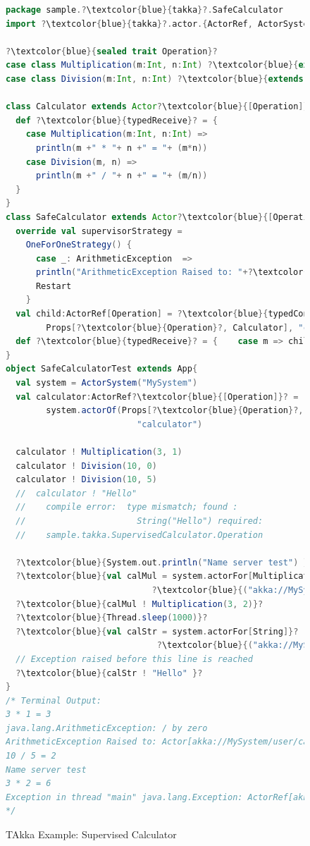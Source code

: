 \begin{figure}[p]
    \begin{lstlisting}[language=scala, escapechar=?]
package sample.?\textcolor{blue}{takka}?.SafeCalculator
import ?\textcolor{blue}{takka}?.actor.{ActorRef, ActorSystem, Props, Actor}

?\textcolor{blue}{sealed trait Operation}?
case class Multiplication(m:Int, n:Int) ?\textcolor{blue}{extends Operation}?
case class Division(m:Int, n:Int) ?\textcolor{blue}{extends Operation}?

class Calculator extends Actor?\textcolor{blue}{[Operation]}?{
  def ?\textcolor{blue}{typedReceive}? = {
    case Multiplication(m:Int, n:Int) =>
      println(m +" * "+ n +" = "+ (m*n))    
    case Division(m, n) =>
      println(m +" / "+ n +" = "+ (m/n))
  }
}
class SafeCalculator extends Actor?\textcolor{blue}{[Operation]}? {
  override val supervisorStrategy =
    OneForOneStrategy() {
      case _: ArithmeticException  =>
      println("ArithmeticException Raised to: "+?\textcolor{blue}{typedSelf}?)
      Restart
    }
  val child:ActorRef[Operation] = ?\textcolor{blue}{typedContext}?.actorOf(
  		Props[?\textcolor{blue}{Operation}?, Calculator], "child")
  def ?\textcolor{blue}{typedReceive}? = {    case m => child ! m  }
}
object SafeCalculatorTest extends App{
  val system = ActorSystem("MySystem")
  val calculator:ActorRef?\textcolor{blue}{[Operation]}? = 
        system.actorOf(Props[?\textcolor{blue}{Operation}?, SafeCalculator], 
                          "calculator")
                          
  calculator ! Multiplication(3, 1)
  calculator ! Division(10, 0)
  calculator ! Division(10, 5)                          
  //  calculator ! "Hello" 
  //    compile error:  type mismatch; found : 
  //                      String("Hello") required: 
  //    sample.takka.SupervisedCalculator.Operation
  
  ?\textcolor{blue}{System.out.println("Name server test") }?
  ?\textcolor{blue}{val calMul = system.actorFor[Multiplication]}?
                             ?\textcolor{blue}{("akka://MySystem/user/calculator")}?
  ?\textcolor{blue}{calMul ! Multiplication(3, 2)}?
  ?\textcolor{blue}{Thread.sleep(1000)}?
  ?\textcolor{blue}{val calStr = system.actorFor[String]}?
                              ?\textcolor{blue}{("akka://MySystem/user/calculator")}?
  // Exception raised before this line is reached                              
  ?\textcolor{blue}{calStr ! "Hello" }?
}
/* Terminal Output:
3 * 1 = 3
java.lang.ArithmeticException: / by zero
ArithmeticException Raised to: Actor[akka://MySystem/user/calculator]
10 / 5 = 2
Name server test
3 * 2 = 6
Exception in thread "main" java.lang.Exception: ActorRef[akka://MySystem/user/calculator] does not exist or does not have type ActorRef[String]
*/
    \end{lstlisting}
    \caption{TAkka Example: Supervised Calculator}
  \vspace*{1 in}    
    \label{takka:supervisedcalculator}
\end{figure}








